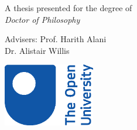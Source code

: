 \begin{titlepage}
    \begin{center}
        \vspace*{1cm}
            
        \Huge
        \textbf{\thetitle}
            
        \vspace{0.5cm}
        \LARGE
        \Large 
        \vspace{1.5cm}
            
        \textbf{\theauthor}
            
        \vfill
            
        A thesis presented for the degree of\\
        \emph{Doctor of Philosophy}

        \vspace{0.8cm}

        Advisers: Prof. Harith Alani\\
        Dr. Alistair Willis
            
        \vspace{0.8cm}
            
        \includegraphics[width=0.3\textwidth]{images/OU-logo-2017.eps}
        \vspace{1.6cm}
        
        \centering
        \usebox{\largestimage}
        \hfill
        
        
        \vspace{0.8cm}
            
        \Large
        \thedate
            
    \end{center}
\end{titlepage}